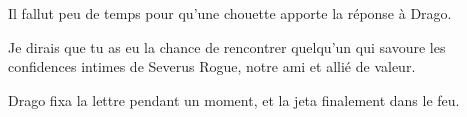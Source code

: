 Il fallut peu de temps pour qu'une chouette apporte la réponse à Drago.

\begin{writtenNote}

Je dirais que tu as eu la chance de rencontrer quelqu'un qui savoure les confidences intimes de Severus Rogue, notre ami et allié de valeur.

\end{writtenNote}

Drago fixa la lettre pendant un moment, et la jeta finalement dans le feu.

